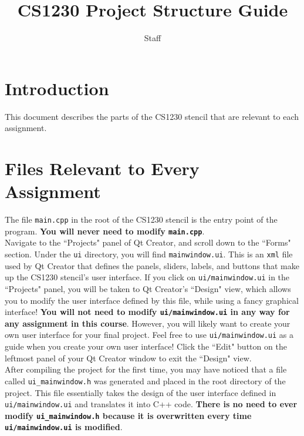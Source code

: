 \documentclass[landscape,twocolumn,letterpaper]{article}
\title{CS1230 Project Structure Guide}
\author{Staff}
\begin{document}
\maketitle

\section{Introduction}

This document describes the parts of the CS1230 stencil that are relevant to each assignment.

\section{Files Relevant to Every Assignment}

The file \texttt{main.cpp} in the root of the CS1230 stencil is  the entry point of the program. \textbf{You will never need to modify \texttt{main.cpp}}.\\

\noindent
Navigate to the ``Projects" panel of Qt Creator, and scroll down to the ``Forms" section. Under the \texttt{ui} directory, you will find \texttt{mainwindow.ui}. This is an \texttt{xml} file used by Qt Creator that defines the panels, sliders, labels, and buttons that make up the CS1230 stencil's user interface. If you click on \texttt{ui/mainwindow.ui} in the ``Projects" panel, you will be taken to Qt Creator's ``Design" view, which allows you to modify the user interface defined by this file, while using a fancy graphical interface! \textbf{You will not need to modify \texttt{ui/mainwindow.ui} in any way for any assignment in this course}. However, you will likely want to create your own user interface for your final project. Feel free to use \texttt{ui/mainwindow.ui} as a guide when you create your own user interface! Click the ``Edit" button on the leftmost panel of your Qt Creator window to exit the ``Design" view.\\

\noindent
After compiling the project for the first time, you may have noticed that a file called \texttt{ui\_mainwindow.h} was generated and placed in the root directory of the project. This file essentially takes the design of the user interface defined in \texttt{ui/mainwindow.ui} and translates it into C++ code. \textbf{There is no need to ever modify \texttt{ui\_mainwindow.h} because it is overwritten every time \texttt{ui/mainwindow.ui} is modified}.\\
\end{document}
